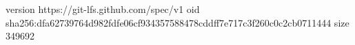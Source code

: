 version https://git-lfs.github.com/spec/v1
oid sha256:dfa62739764d982fdfe06cf934357588478cddff7e717c3f260c0c2cb0711444
size 349692
